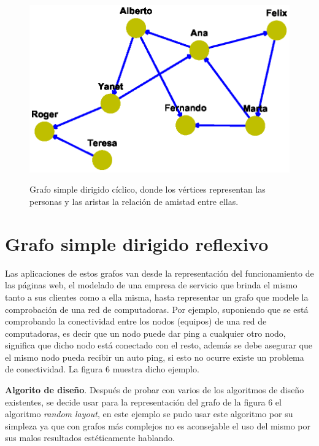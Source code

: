 \documentclass{article}
\begin{document}
\begin{figure}[h]
\begin{center}
\includegraphics[scale=0.7]{Graf5_kamada_kawai_layout.eps}\\
\caption{Grafo simple dirigido cíclico, donde los vértices representan las personas y las aristas la relación de amistad entre ellas. }
\end{center}
\end{figure}

\newpage

\section{Grafo simple dirigido reflexivo}

Las aplicaciones de estos grafos van desde la representación del funcionamiento de las páginas web, el modelado de una empresa de servicio que brinda el mismo tanto a sus clientes como a ella misma, hasta representar un grafo que modele la comprobación de una red de computadoras.\linebreak
Por ejemplo, suponiendo que se está comprobando la conectividad entre los nodos (equipos) de una red de computadoras, es decir que un nodo puede dar ping a cualquier otro nodo, significa que dicho nodo está conectado con el resto, además se debe asegurar que el mismo nodo pueda recibir un auto ping, si esto no ocurre existe un problema de conectividad. La figura 6 muestra dicho ejemplo.\linebreak

\textbf{Algorito de diseño}.\linebreak
Después de probar con varios de los algoritmos de diseño existentes, se decide usar para la representación del grafo de la figura 6 el algoritmo \textit{random layout}, en este ejemplo se pudo usar este algoritmo por su simpleza ya que con grafos más complejos no es aconsejable el uso del mismo por sus malos resultados estéticamente hablando.
\end{document}
